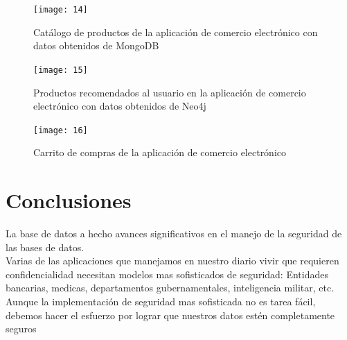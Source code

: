 \documentclass[conference]{IEEEtran}
\begin{document}
\begin{figure}[!h]
\centering
\texttt{[image: 14]}
\caption{Cat\'alogo de productos de la aplicaci\'on de comercio electr\'onico con datos obtenidos de MongoDB}
\label{}
\end{figure}

\begin{figure}[!h]
\centering
\texttt{[image: 15]}
\caption{Productos recomendados al usuario en la aplicaci\'on de comercio electr\'onico con datos obtenidos de Neo4j}
\label{}
\end{figure}

\begin{figure}[!h]
\centering
\texttt{[image: 16]}
\caption{Carrito de compras de la aplicaci\'on de comercio electr\'onico}
\label{}
\end{figure}


\section{Conclusiones}
  La base de datos a hecho avances significativos en el manejo de la seguridad de las bases de datos.
  \\
  Varias de las aplicaciones que manejamos en nuestro diario vivir que requieren confidencialidad necesitan modelos mas sofisticados de seguridad: Entidades bancarias, medicas, departamentos gubernamentales, inteligencia militar, etc.
  \\
  Aunque la implementación de seguridad mas sofisticada no es tarea fácil, debemos hacer el esfuerzo por lograr que nuestros datos estén completamente seguros


\ifCLASSOPTIONcaptionsoff
  \newpage
\fi
\end{document}

